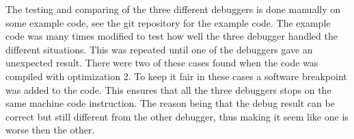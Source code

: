 %
%
%


%


The testing and comparing of the three different debuggers is done manually on some example code, see the git repository \cite{example-code} for the example code.
The example code was many times modified to test how well the three debugger handled the different situations.
This was repeated until one of the debuggers gave an unexpected result.
There were two of these cases found when the code was compiled with optimization 2.
To keep it fair in these cases a software breakpoint was added to the code.
This ensures that all the three debuggers stops on the same machine code instruction.
The reason being that the debug result can be correct but still different from the other debugger, thus making it seem like one is worse then the other.


